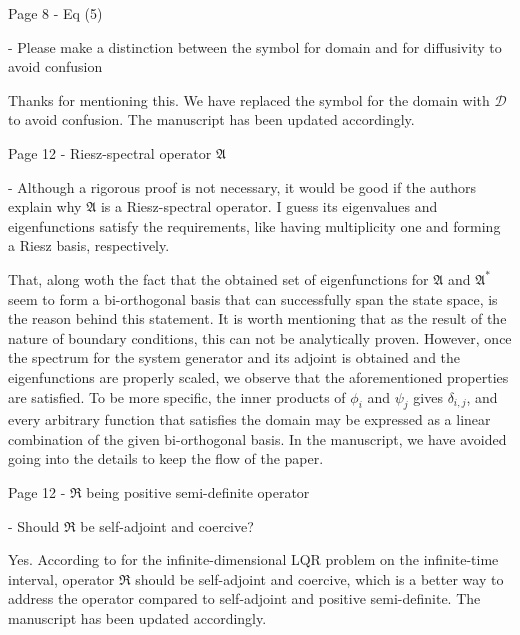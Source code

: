 \documentclass[12pt,answers]{exam}
\begin{document}
\begin{questions}
    \question Page 8 - Eq (5)
    
    - Please make a distinction between the symbol for domain and for diffusivity to avoid confusion

    \begin{solutionorbox}
        Thanks for mentioning this. We have replaced the symbol for the domain with $\mathcal{D}$ to avoid confusion. The manuscript has been updated accordingly.
    \end{solutionorbox}


    \question Page 12 - Riesz-spectral operator $\mathfrak{A}$

    - Although a rigorous proof is not necessary, it would be good if the authors explain why $\mathfrak{A}$ is a Riesz-spectral operator. I guess its eigenvalues and eigenfunctions satisfy the requirements, like having multiplicity one and forming a Riesz basis, respectively.

    \begin{solutionorbox}
        That, along woth the fact that the obtained set of eigenfunctions for $\mathfrak{A}$ and $\mathfrak{A}^*$ seem to form a bi-orthogonal basis that can successfully span the state space, is the reason behind this statement. It is worth mentioning that as the result of the nature of boundary conditions, this can not be analytically proven. However, once the spectrum for the system generator and its adjoint is obtained and the eigenfunctions are properly scaled, we observe that the aforementioned properties are satisfied. To be more specific, the inner products of $\phi_i$ and $\psi_j$ gives $\delta_{i,j}$, and every arbitrary function that satisfies the domain may be expressed as a linear combination of the given bi-orthogonal basis. In the manuscript, we have avoided going into the details to keep the flow of the paper.
    \end{solutionorbox}


    \question Page 12 - $\mathfrak{R}$ being positive semi-definite operator

    - Should $\mathfrak{R}$ be self-adjoint and coercive?

    \begin{solutionorbox}
        Yes. According to \cite{curtainbook} for the infinite-dimensional LQR problem on the infinite-time interval, operator $\mathfrak{R}$ should be self-adjoint and coercive, which is a better way to address the operator compared to self-adjoint and positive semi-definite. The manuscript has been updated accordingly.
    \end{solutionorbox}



\end{questions}
\end{document}
